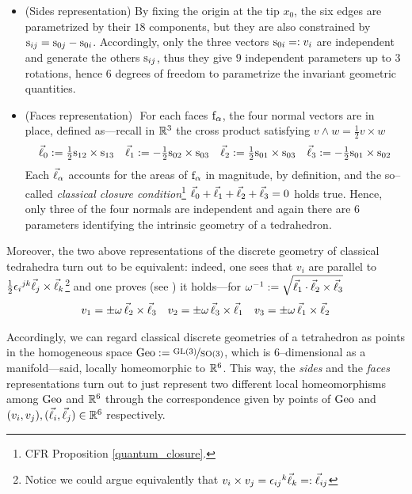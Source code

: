 \begin{itemize}
    \item (Sides representation)\,\,By fixing the origin at the tip $x_0$, the six edges are parametrized by their $18$ components, but they are also constrained by $\text{\normalfont s}_{ij}=\text{\normalfont s}_{0j}-\text{\normalfont s}_{0i}$. Accordingly, only the three vectors $\text{\normalfont s}_{0i}=:v_i$ are independent and generate the others $\text{\normalfont s}_{ij}$, thus they give $9$ independent parameters up to $3$ rotations, hence $6$ degrees of freedom to parametrize the invariant geometric quantities.

    \item  (Faces representation)\,\, For each faces $\text{\normalfont f}_\alpha$, the four normal vectors are in place, defined as---recall in $\mathbb{R}^3$ the cross product satisfying  $v\wedge w=\frac{1}{2}v\times w$ 
    $$\begin{matrix}
        \vec{\ell}_0:=\frac{1}{2}\text{\normalfont s}_{12}\times\text{\normalfont s}_{13} & \vec{\ell}_1:=-\frac{1}{2}\text{\normalfont s}_{02}\times\text{\normalfont s}_{03} & \vec{\ell}_2:=\frac{1}{2}\text{\normalfont s}_{01}\times\text{\normalfont s}_{03} & \vec{\ell}_3:=-\frac{1}{2}\text{\normalfont s}_{01}\times\text{\normalfont s}_{02} 
    \end{matrix}$$
    Each $\vec{\ell}_\alpha$ accounts for the areas of $\text{\normalfont f}_\alpha$ in magnitude, by definition, and the so--called \emph{classical closure condition}\footnote{CFR Proposition \ref{quantum_closure}.} $\vec{\ell}_0+\vec{\ell}_1+\vec{\ell}_2+\vec{\ell}_3=0$ holds true. Hence, only three of the four normals are independent and again there are $6$ parameters identifying the intrinsic geometry of a tedrahedron. 
\end{itemize}
Moreover, the two above representations of the discrete geometry of classical tedrahedra turn out to be equivalent: indeed, one sees that $v_i$ are parallel to $\frac{1}{2}{\epsilon_i}^{jk}\vec{\ell}_j\times\vec{\ell}_k$\footnote{Notice we could argue equivalently that $v_i\times v_j={\epsilon_{ij}}^k\vec{\ell}_k=:\vec{\ell}_{ij}$} and one proves (see \cite{LN9}) it holds---for $\omega^{-1}:=\sqrt{\vec{\ell}_1\cdot\vec{\ell}_2\times\vec{\ell}_3}$
$$\begin{matrix}
    v_1=\pm\omega\,\vec{\ell}_2\times\vec{\ell}_3 & v_2=\pm\omega\,\vec{\ell}_3\times\vec{\ell}_1 & v_3=\pm\omega\,\vec{\ell}_1\times\vec{\ell}_2
\end{matrix}$$

Accordingly, we can regard classical discrete geometries of a tetrahedron as points in the homogeneous space $\text{\normalfont Geo}:=\nicefrac{\text{\normalfont GL}(3)}{\text{\normalfont SO}(3)}$,
which is $6$--dimensional as a manifold---said, locally homeomorphic to $\mathbb{R}^6$. This way, the \emph{sides} and the \emph{faces} representations turn out to just represent two different local homeomorphisms among $\text{\normalfont Geo}$ and $\mathbb{R}^6$ through the correspondence given by points of $\text{\normalfont Geo}$ and $(v_i,v_j),(\vec{\ell}_i,\vec{\ell}_j)\in\mathbb{R}^6$ respectively.

